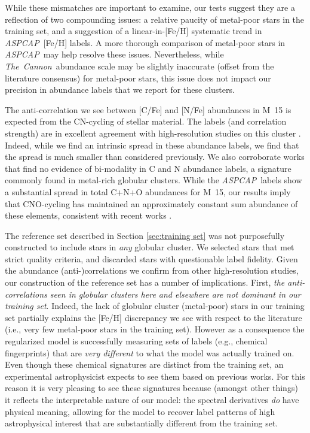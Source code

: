 \documentclass[12pt,preprint]{aastex}
\newcommand{\project}[1]{\textsl{#1}}
\newcommand{\TheCannon}{\project{The~Cannon}}
\newcommand{\acronym}[1]{{\small{#1}}}
\newcommand{\aspcap}{\project{\acronym{ASPCAP}}}
\begin{document}
While these mismatches are important to examine, our tests suggest they
are a reflection of two compounding issues: a relative paucity of metal-poor
stars in the training set, and a suggestion of a linear-in-[Fe/H] systematic
trend in \aspcap\ [Fe/H] labels.  A more thorough comparison of metal-poor
stars in \aspcap\ may help resolve these issues.  Nevertheless, while
\TheCannon\ abundance scale may be slightly inaccurate (offset from the
literature consensus) for metal-poor stars, this issue does not impact
our precision in abundance labels that we report for these clusters.  


The anti-correlation we see between [C/Fe] and [N/Fe] abundances in M~15 is
expected from the CN-cycling of stellar material.  The labels (and correlation
strength) are in excellent agreement with high-resolution studies on this cluster
\citep{Cohen_2005}.  Indeed, while we find an intrinsic spread in these abundance
labels, we find that the spread is much smaller than considered previously.  We also
corroborate works that find no evidence of bi-modality in C and N 
abundance labels, a signature commonly found in metal-rich globular clusters.
While the \aspcap\ labels show a substantial spread in total C+N+O abundances
for M~15, our results imply that CNO-cycling has maintained an approximately
constant sum abundance of these elements, consistent with recent works
\citep{Meszaros_2015}.


The reference set described in Section \ref{sec:training set} was not
purposefully constructed to include stars in \emph{any} globular
cluster.  We selected stars that met strict quality criteria, and
discarded stars with questionable label fidelity.  Given the
abundance (anti-)correlations we confirm from other high-resolution
studies, our construction of the reference set has a number of
implications.  First, \emph{the anti-correlations seen in globular 
clusters here and elsewhere are not dominant in our training set}.
Indeed, the lack of globular cluster (metal-poor) stars in our 
training set partially explains the [Fe/H] discrepancy we see with
respect to the literature (i.e., very few metal-poor stars in the
training set).  However as a consequence the regularized model is 
successfully measuring sets of labels (e.g., chemical fingerprints) that are 
\emph{very different} to what the model was actually trained on.  
Even though these chemical signatures are distinct from the training
set, an experimental astrophysicist expects to see them based on previous works.  For this
reason it is very pleasing to see these signatures because (amongst
other things) it reflects the interpretable nature of our model: the spectral
derivatives \emph{do} have physical meaning, allowing for the model
to recover label patterns of high astrophysical interest that are 
substantially different from the training set.
\end{document}

